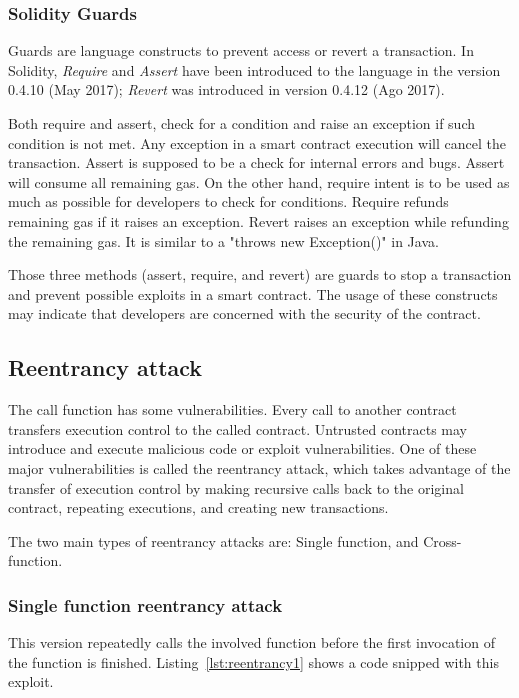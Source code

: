 \documentclass[10pt,conference]{IEEEtran}
\begin{document}
\subsubsection{Solidity Guards}

Guards are language constructs to prevent access or revert a transaction. In Solidity, \textit{Require} and \textit{Assert} have been introduced to the language in the version 0.4.10 (May 2017); \textit{Revert} was introduced in version 0.4.12 (Ago 2017).

Both {require} and {assert}, check for a condition and raise an exception if such condition is not met. Any exception in a smart contract execution will cancel the transaction. Assert is supposed to be a check for internal errors and bugs. Assert will consume all remaining gas. On the other hand, require intent is to be used as much as possible for developers to check for conditions. Require refunds remaining gas if it raises an exception.
%
Revert raises an exception while refunding the remaining gas. It is similar to a "throws new Exception()" in Java.

Those three methods (assert, require, and revert) are guards to stop a transaction and prevent possible exploits in a smart contract. The usage of these constructs may indicate that developers are concerned with the security of the contract.

\subsection{Reentrancy attack}

The call function has some vulnerabilities. Every call to another contract transfers execution control to the called contract. Untrusted contracts may introduce and execute malicious code or exploit vulnerabilities. One of these major vulnerabilities is called the reentrancy attack, which takes advantage of the transfer of execution control by making recursive calls back to the original contract, repeating executions, and creating new transactions.

The two main types of reentrancy attacks are: Single function, and Cross-function.

\subsubsection{Single function reentrancy attack}
This version repeatedly calls the involved function before the first invocation of the function is finished.  Listing~\ref{lst:reentrancy1} shows a code snipped with this exploit.
\end{document}
